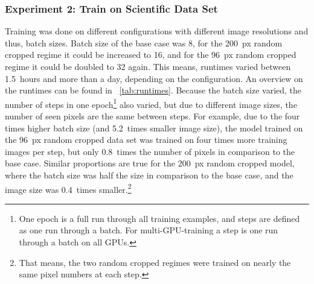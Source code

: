\subsubsection{Experiment 2: Train on Scientific Data Set}\label{subsubsec:results-experiment2res}

Training was done on different configurations with different image resolutions and thus, batch sizes.
Batch size of the base case was 8, for the 200~px random cropped regime it could be increased to 16, and for the 96~px random cropped regime it could be doubled to 32 again.
This means, runtimes varied between 1.5~hours and more than a day, depending on the configuration.
An overview on the runtimes can be found in ~\autoref{tab:runtimes}.
Because the batch size varied, the number of steps in one epoch\footnote{One epoch is a full run through all training examples, and steps are defined as one run through a batch. For multi-GPU-training a step is one run through a batch on all GPUs.} also varied, but due to different image sizes, the number of seen pixels are the same between steps.
For example, due to the four times higher batch size (and 5.2~times smaller image size), the model trained on the 96~px random cropped data set was trained on four times more training images per step, but only 0.8~times the number of pixels in comparison to the base case.
Similar proportions are true for the 200~px random cropped model, where the batch size was half the size in comparison to the base case, and the image size was 0.4~times smaller.\footnote{That means, the two random cropped regimes were trained on nearly the same pixel numbers at each step.}

